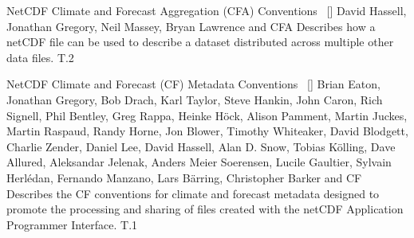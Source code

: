 
\begin{publications}


\publication
	{NetCDF Climate and Forecast Aggregation (CFA) Conventions}{~ [\href{https://TODO}{\small{\linkSymbol}}]}
	{David Hassell, Jonathan Gregory, Neil Massey, Bryan Lawrence and \underline{}}
	{CFA} {Describes how a netCDF file can be used to describe a dataset distributed across multiple other data files.} {T.2}

\publication
	{NetCDF Climate and Forecast (CF) Metadata Conventions}{~ [\href{https://zenodo.org/records/3928319}{\small{\linkSymbol}}]}
	{Brian Eaton, Jonathan Gregory, Bob Drach, Karl Taylor, Steve Hankin, John Caron, Rich Signell, Phil Bentley, Greg Rappa, Heinke Höck, Alison Pamment, Martin Juckes, Martin Raspaud, Randy Horne, Jon Blower, Timothy Whiteaker, David Blodgett, Charlie Zender, Daniel Lee, David Hassell, Alan D. Snow, Tobias Kölling, Dave Allured, Aleksandar Jelenak, Anders Meier Soerensen, Lucile Gaultier, Sylvain Herlédan, Fernando Manzano, Lars Bärring, Christopher Barker and \underline{}}
	{CF} {Describes the CF conventions for climate and forecast metadata designed to promote the processing and sharing of files created with the netCDF Application Programmer Interface.} {T.1}

\end{publications}


\vspace{-3mm}